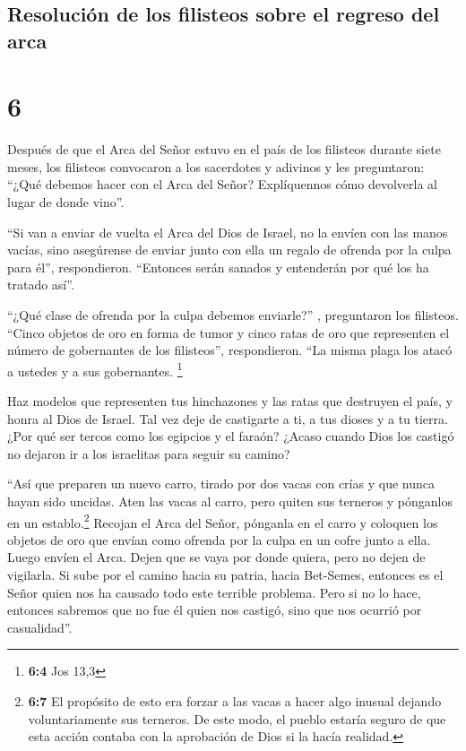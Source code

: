 \hypertarget{resoluciuxf3n-de-los-filisteos-sobre-el-regreso-del-arca}{%
\subsection{Resolución de los filisteos sobre el regreso del
arca}\label{resoluciuxf3n-de-los-filisteos-sobre-el-regreso-del-arca}}

\hypertarget{section-5}{%
\section{6}\label{section-5}}

 Después de que el Arca del Señor estuvo en el país de los
filisteos durante siete meses,  los filisteos convocaron a
los sacerdotes y adivinos y les preguntaron: ``¿Qué debemos hacer con el
Arca del Señor? Explíquennos cómo devolverla al lugar de donde vino''.

 ``Si van a enviar de vuelta el Arca del Dios de Israel,
no la envíen con las manos vacías, sino asegúrense de enviar junto con
ella un regalo de ofrenda por la culpa para él'', respondieron.
``Entonces serán sanados y entenderán por qué los ha tratado así''.

 ``¿Qué clase de ofrenda por la culpa debemos enviarle?''
, preguntaron los filisteos. ``Cinco objetos de oro en forma de tumor y
cinco ratas de oro que representen el número de gobernantes de los
filisteos'', respondieron. ``La misma plaga los atacó a ustedes y a sus
gobernantes. \footnote{\textbf{6:4} Jos 13,3}

 Haz modelos que representen tus hinchazones y las ratas
que destruyen el país, y honra al Dios de Israel. Tal vez deje de
castigarte a ti, a tus dioses y a tu tierra.  ¿Por qué ser
tercos como los egipcios y el faraón? ¿Acaso cuando Dios los castigó no
dejaron ir a los israelitas para seguir su camino?

 ``Así que preparen un nuevo carro, tirado por dos vacas
con crías y que nunca hayan sido uncidas. Aten las vacas al carro, pero
quiten sus terneros y pónganlos en un establo.\footnote{\textbf{6:7} El
  propósito de esto era forzar a las vacas a hacer algo inusual dejando
  voluntariamente sus terneros. De este modo, el pueblo estaría seguro
  de que esta acción contaba con la aprobación de Dios si la hacía
  realidad.}  Recojan el Arca del Señor, pónganla en el
carro y coloquen los objetos de oro que envían como ofrenda por la culpa
en un cofre junto a ella. Luego envíen el Arca. Dejen que se vaya por
donde quiera,  pero no dejen de vigilarla. Si sube por el
camino hacia su patria, hacia Bet-Semes, entonces es el Señor quien nos
ha causado todo este terrible problema. Pero si no lo hace, entonces
sabremos que no fue él quien nos castigó, sino que nos ocurrió por
casualidad''.

